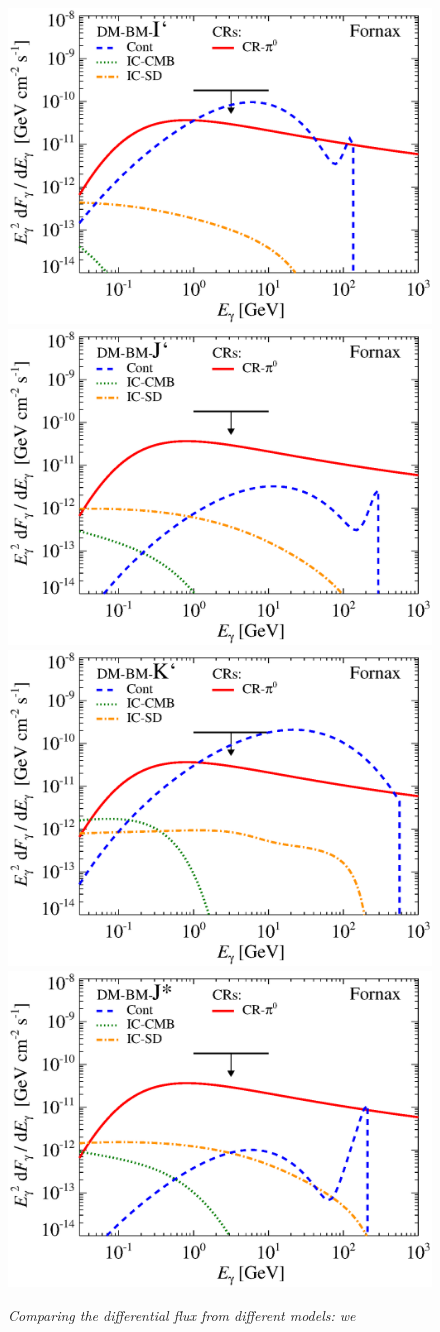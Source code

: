 \documentclass[10pt,aps,pra,reprint,amsmath,amsfonts,amssymb,showpacs]{revtex4-1}
\begin{document}
\begin{figure}
\begin{minipage}{2.0\columnwidth}
 \includegraphics[width=0.49\columnwidth]{figures/flux.BMcompI.v10.0.1deg.1.6T.SubMass.IR2.noMW.woGal.eps}
\includegraphics[width=0.49\columnwidth]{figures/flux.BMcompJ.v10.0.1deg.1.6T.SubMass.IR2.noMW.woGal.eps}
\includegraphics[width=0.49\columnwidth]{figures/flux.BMcompK.v10.0.1deg.1.6T.SubMass.IR2.noMW.woGal.eps}
\includegraphics[width=0.49\columnwidth]{figures/flux.BMcompJs.v10.0.1deg.1.6T.SubMass.IR2.noMW.woGal.eps}
\caption{\it Comparing the differential flux from different models: we
}
\end{minipage}
\end{figure}
\end{document}

